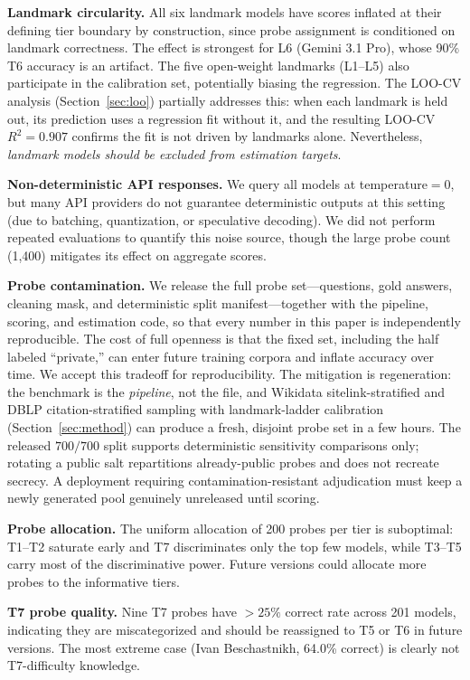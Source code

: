 \documentclass[11pt]{article}
\begin{document}
\textbf{Landmark circularity.} All six landmark models have scores inflated at their defining tier boundary by construction, since probe assignment is conditioned on landmark correctness. The effect is strongest for L6 (Gemini 3.1 Pro), whose 90\% T6 accuracy is an artifact. The five open-weight landmarks (L1--L5) also participate in the calibration set, potentially biasing the regression. The LOO-CV analysis (Section~\ref{sec:loo}) partially addresses this: when each landmark is held out, its prediction uses a regression fit without it, and the resulting LOO-CV $R^2 = 0.907$ confirms the fit is not driven by landmarks alone. Nevertheless, \emph{landmark models should be excluded from estimation targets}.

\textbf{Non-deterministic API responses.} We query all models at temperature${}=0$, but many API providers do not guarantee deterministic outputs at this setting (due to batching, quantization, or speculative decoding). We did not perform repeated evaluations to quantify this noise source, though the large probe count (1{,}400) mitigates its effect on aggregate scores.

\textbf{Probe contamination.} We release the full probe set---questions, gold answers, cleaning mask, and deterministic split manifest---together with the pipeline, scoring, and estimation code, so that every number in this paper is independently reproducible. The cost of full openness is that the fixed set, including the half labeled ``private,'' can enter future training corpora and inflate accuracy over time. We accept this tradeoff for reproducibility. The mitigation is regeneration: the benchmark is the \emph{pipeline}, not the file, and Wikidata sitelink-stratified and DBLP citation-stratified sampling with landmark-ladder calibration (Section~\ref{sec:method}) can produce a fresh, disjoint probe set in a few hours. The released $700/700$ split supports deterministic sensitivity comparisons only; rotating a public salt repartitions already-public probes and does not recreate secrecy. A deployment requiring contamination-resistant adjudication must keep a newly generated pool genuinely unreleased until scoring.

\textbf{Probe allocation.} The uniform allocation of 200 probes per tier is suboptimal: T1--T2 saturate early and T7 discriminates only the top few models, while T3--T5 carry most of the discriminative power. Future versions could allocate more probes to the informative tiers.

\textbf{T7 probe quality.} Nine T7 probes have $>25\%$ correct rate across 201 models, indicating they are miscategorized and should be reassigned to T5 or T6 in future versions. The most extreme case (Ivan Beschastnikh, 64.0\% correct) is clearly not T7-difficulty knowledge.
\end{document}
